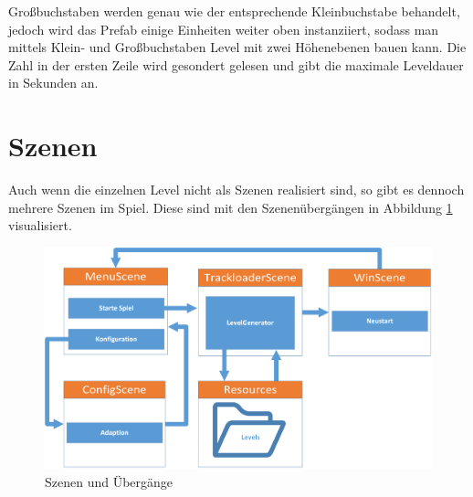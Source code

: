 Großbuchstaben werden genau wie der entsprechende Kleinbuchstabe behandelt, jedoch wird das Prefab einige Einheiten weiter oben instanziiert, sodass man mittels Klein- und Großbuchstaben Level mit zwei Höhenebenen bauen kann. Die Zahl in der ersten Zeile wird gesondert gelesen und gibt die maximale Leveldauer in Sekunden an.
\section{Szenen}
Auch wenn die einzelnen Level nicht als Szenen realisiert sind, so gibt es dennoch mehrere Szenen im Spiel. Diese sind mit den Szenenübergängen in Abbildung \ref{Szenen} visualisiert.\\
\begin{figure}[ht]
\centering
\includegraphics[width=.7\textwidth]{gfx/Szenen.png}
\caption{Szenen und Übergänge}
\label{Szenen}
\end{figure}